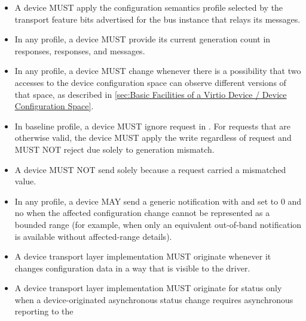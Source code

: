 \begin{itemize}
  \item A device MUST apply the configuration semantics profile selected by the
        transport feature bits advertised for the bus instance that relays its
        messages.
  \item In any profile, a device MUST provide its current generation count in
         responses,  responses, and
         messages.
  \item In any profile, a device MUST change  whenever there
        is a possibility that two accesses to the device configuration space
        can observe different versions of that space, as described in
        \ref{sec:Basic Facilities of a Virtio Device / Device Configuration Space}.
  \item In baseline profile, a device MUST ignore request  in
        . For requests that are otherwise valid, the device
        MUST apply the write regardless of request  and MUST
        NOT reject  due solely to generation mismatch.
  \item A device MUST NOT send  solely because a
         request carried a mismatched 
        value.
  \item In any profile, a device MAY send a generic
         notification with  and
         set to 0 and no  when the affected
        configuration change cannot be represented as a bounded range
        (for example, when only an equivalent out-of-band notification is
        available without affected-range details).
  \item A device transport layer implementation MUST originate
         whenever it changes configuration data in a way
        that is visible to the driver.
  \item A device transport layer implementation MUST originate
         for status only when a device-originated
        asynchronous status change requires asynchronous reporting to the

\end{itemize}

